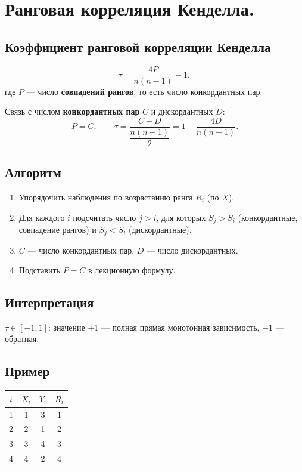 \section{Ранговая корреляция Кенделла.}

\subsection*{Коэффициент ранговой корреляции Кенделла}

\[
  \tau = \frac{4P}{n(n-1)} - 1,
\]
где $P$ — число \textbf{совпадений рангов}, то есть число конкордантных пар.

Связь с числом \textbf{конкордантных пар} $C$ и дискордантных $D$:
\[
  P = C, \qquad
  \tau = \frac{C - D}{\dfrac{n(n-1)}{2}}
       = 1 - \frac{4D}{n(n-1)}.
\]

\subsection*{Алгоритм}

\begin{enumerate}
  \item Упорядочить наблюдения по возрастанию ранга $R_i$ (по $X$).
  \item Для каждого $i$ подсчитать число $j > i$, для которых $S_j > S_i$ (конкордантные, совпадение рангов) и $S_j < S_i$ (дискордантные).
  \item $C$ — число конкордантных пар, $D$ — число дискордантных.
  \item Подставить $P = C$ в лекционную формулу.
\end{enumerate}

\subsection*{Интерпретация}

$\tau \in [-1, 1]$: значение $+1$ — полная прямая монотонная зависимость, $-1$ — обратная.

\subsection*{Пример}

\begin{center}
\begin{tabular}{cccc}
  \hline
  $i$ & $X_i$ & $Y_i$ & $R_i$ \\
  \hline
  1 & 1 & 3 & 1 \\
  2 & 2 & 1 & 2 \\
  3 & 3 & 4 & 3 \\
  4 & 4 & 2 & 4 \\
  \hline
\end{tabular}
\end{center}

